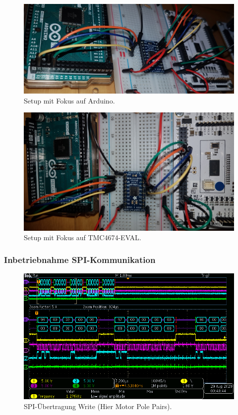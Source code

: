 \begin{figure}[H]
	\centering
	\includegraphics[width=\textwidth]{graphics/1_Arduino}
	\caption{Setup mit Fokus auf Arduino.}
	\label{fig:1_Arduino}
\end{figure}

\begin{figure}[H]
	\centering
	\includegraphics[angle=180,width=\textwidth]{graphics/1_EVAL}
	\caption{Setup mit Fokus auf TMC4674-EVAL.}
	\label{fig:1_EVAL}
\end{figure}

\subsubsection{Inbetriebnahme SPI-Kommunikation}\label{Appendix:TMC4671_SPI}

\begin{figure}[H]
\center
\includegraphics[width = \textwidth]{graphics/TMC4671_Beschreiben_1}
\caption{SPI-Übertragung Write (Hier Motor Pole Pairs).}
\label{fig:TMC4671_Lesen_1}
\end{figure}

